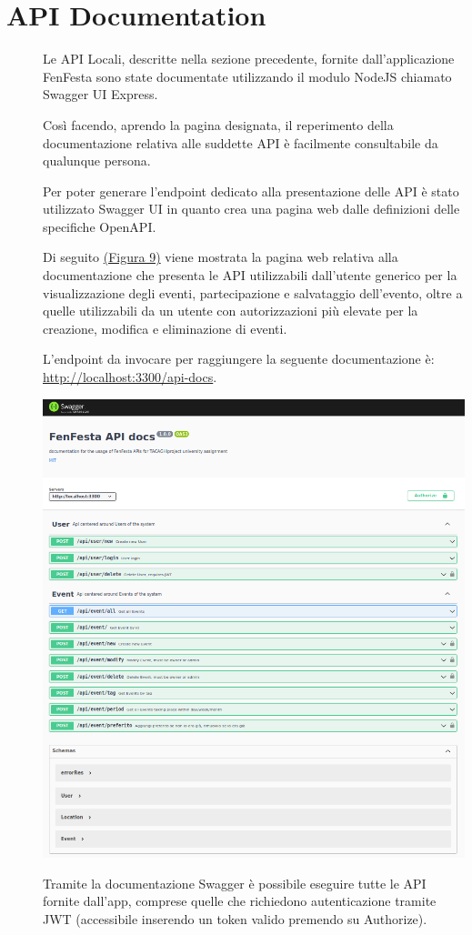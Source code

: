 \documentclass{article}
\begin{document}
\section{API Documentation}
\begin{description}
    \item[] Le API Locali, descritte nella sezione precedente, fornite dall'applicazione FenFesta sono state documentate utilizzando il modulo NodeJS chiamato Swagger UI Express.
    \item[] Così facendo, aprendo la pagina designata, il reperimento della documentazione relativa alle suddette API è facilmente consultabile da qualunque persona.
    \item[] Per poter generare l'endpoint dedicato alla presentazione delle API è stato utilizzato Swagger UI in quanto crea una pagina web dalle definizioni delle specifiche OpenAPI.
    \item[] Di seguito \hyperref[img:9]{(Figura 9)} viene mostrata la pagina web relativa alla documentazione che presenta le API utilizzabili dall'utente generico per la visualizzazione degli eventi, partecipazione e salvataggio dell'evento, oltre a quelle utilizzabili da un utente con autorizzazioni più elevate per la creazione, modifica e eliminazione di eventi.
    \item[] L'endpoint da invocare per raggiungere la seguente documentazione è: \url{http://localhost:3300/api-docs}.
    \item[] \label{img:9} \begin{center}
            \includegraphics[scale=0.5]{documentazione.png}
        \end{center}
    \item[] Tramite la documentazione Swagger è possibile eseguire tutte le API fornite dall'app, comprese quelle che richiedono autenticazione tramite JWT (accessibile inserendo un token valido premendo su Authorize).
\end{description}
\clearpage
\end{document}

